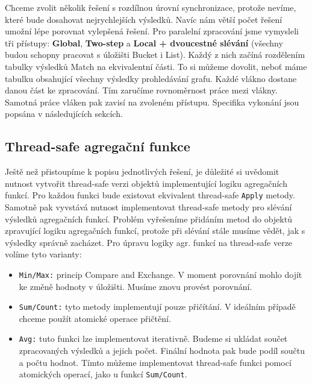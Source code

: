 Chceme zvolit několik řešení s rozdílnou úrovní synchronizace, protože nevíme, které bude dosahovat nejrychlejších výsledků.
Navíc nám větší počet řešení umožní lépe porovnat vylepšená řešení.
Pro paralelní zpracování jsme vymysleli tři přístupy: \textbf{Global}, \textbf{Two-step} a \textbf{Local + dvoucestné slévání} (všechny budou schopny pracovat s úložišti Bucket i List).
Každý z nich začíná rozdělením tabulky výsledků Match na ekvivalentní části.
To si můžeme dovolit, neboť máme tabulku obsahující všechny výsledky prohledávání grafu.
Každé vlákno dostane danou část ke zpracování.
Tím zaručíme rovnoměrnost práce mezi vlákny.
Samotná práce vláken pak zavisí na zvoleném přístupu.
Specifika vykonání jsou popsána v následujících sekcích.

\subsection{Thread-safe agregační funkce}

Ještě než přistoupíme k popisu jednotlivých řešení, je důležité si uvědomit nutnost vytvořit thread-safe verzi objektů implementující logiku agregačních funkcí.
Pro každou funkci bude existovat ekvivalent thread-safe \texttt{Apply} metody.
Samotně pak vyvstává nutnost implementovat thread-safe metody pro slévání výsledků agregačních funkcí.
Problém vyřešeníme přidáním metod do objektů zpravující logiku agregačních funkcí, protože při slévání stále musíme vědět, jak s výsledky správně zacházet.
Pro úpravu logiky agr. funkcí na thread-safe verze volíme tyto varianty:

\begin{itemize}

\item \texttt{Min/Max:} princip Compare and Exchange. V moment porovnání mohlo dojít ke změně hodnoty v úložišti.
Musíme znovu provést porovnání.  

\item \texttt{Sum/Count:} tyto metody implementují pouze přičítání. 
V ideálním případě chceme použít atomické operace přičtění.
 
\item \texttt{Avg:} tuto funkci lze implementovat iterativně. 
Budeme si ukládat součet zpracovaných výsledků a jejich počet.
Finální hodnota pak bude podíl součtu a počtu hodnot.
Tímto můžeme implementovat thread-safe funkci pomocí atomických operací, jako u funkcí \texttt{Sum/Count}.
\end{itemize}

